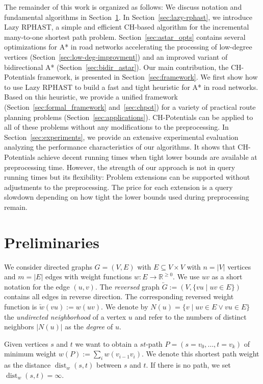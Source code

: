 \documentclass[manuscript,review]{acmart}
\newcommand*{\dist}{\operatorname{dist}}
\begin{document}
The remainder of this work is organized as follows:
We discuss notation and fundamental algorithms in Section~\ref{sec:preliminaries}.
In Section~\ref{sec:lazy-rphast}, we introduce Lazy RPHAST, a simple and efficient CH-based algorithm for the incremental many-to-one shortest path problem.
Section~\ref{sec:astar_opts} contains several optimizations for A* in road networks accelerating the processing of low-degree vertices (Section~\ref{sec:low-deg-improvment}) and an improved variant of bidirectional A* (Section~\ref{sec:bidir_astar}).
Our main contribution, the CH-Potentials framework, is presented in Section~\ref{sec:framework}.
We first show how to use Lazy RPHAST to build a fast and tight heuristic for A* in road networks.
Based on this heuristic, we provide a unified framework (Section~\ref{sec:formal_framework} and~\ref{sec:chpot}) for a variety of practical route planning problems (Section~\ref{sec:applications}).
CH-Potentials can be applied to all of these problems without any modifications to the preprocessing.
In Section~\ref{sec:experiments}, we provide an extensive experimental evaluation analyzing the performance characteristics of our algorithms.
It shows that CH-Potentials achieve decent running times when tight lower bounds are available at preprocessing time.
However, the strength of our approach is not in query running times but its flexibility:
Problem extensions can be supported without adjustments to the preprocessing.
The price for each extension is a query slowdown depending on how tight the lower bounds used during preprocessing remain.

\section{Preliminaries}\label{sec:preliminaries}

We consider directed graphs $G=(V,E)$ with $E \subseteq V \times V$ with $n=|V|$ vertices and $m=|E|$ edges with weight functions $w : E \to \mathbb{R}^{\geq 0}$.
We use $uv$ as a short notation for the edge $(u,v)$.
The \emph{reversed} graph $\overleftarrow{G} := (V, \{ vu \mid uv \in E \})$ contains all edges in reverse direction.
The corresponding reversed weight function is $\overleftarrow{w}(vu) := w(uv)$.
We denote by $N(u) = \{ v \mid uv \in E \vee vu \in E \}$ the \emph{undirected neighborhood} of a vertex $u$ and refer to the numbers of distinct neighbors $|N(u)|$ as the \emph{degree} of $u$.

Given vertices $s$ and $t$ we want to obtain a $st$-path $P=(s=v_0,\dots,t=v_k)$ of minimum weight $w(P) := \sum_{i} w(v_{i-1}v_i)$.
We denote this shortest path weight as the distance $\dist_w(s,t)$ between $s$ and $t$.
If there is no path, we set $\dist_w(s,t)=\infty$.
\end{document}
